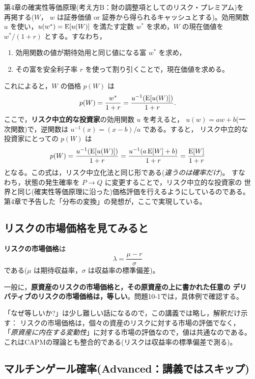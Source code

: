 第4章の確実性等価原理(考え方B：財の調整項としてのリスク・プレミアム)を
再掲する($W$， $w$ は証券価値 or 証券から得られるキャッシュとする)。効用関数
$u$ を使い，$u(w^*) = \mathrm{E}[u(W)]$ を満たす定数 $w^*$ を求め，$W$ の現在価値を
$w^*/(1+r)$ とする。すなわち，
\begin{enumerate}
\item 効用関数の値が期待効用と同じ値になる富 $w^*$ を求め，
\item その富を安全利子率 $r$ を使って割り引くことで，現在価値を求める。
\end{enumerate}

これによると，$W$ の価格 $p(W)$ は
\[
p(W) = \frac{w^*}{1+r} = \frac{u^{-1}(\mathrm{E}[u(W)])}{1+r}.
\]
ここで，\textbf{リスク中立的な投資家}の効用関数 $u$ を考えると，
$u(w) = aw + b$(一次関数)で，逆関数は $u^{-1}(x) = (x-b)/a$ である。すると，
リスク中立的な投資家にとっての $p(W)$ は
\[
p(W) = \frac{u^{-1}(\mathrm{E}[u(W)])}{1+r}
= \frac{u^{-1}(a\,\mathrm{E}[W] + b)}{1+r}
= \frac{\mathrm{E}[W]}{1+r}
\]
となる。この式は，リスク中立化法と同じ形である(\emph{違うのは確率だけ})。
すなわち，状態の発生確率を $P\to Q$ に変更することで，リスク中立的な投資家の
世界と同じ(確実性等価原理に沿った)価格評価を行えるようにしているのである。
第4章で予告した「分布の変換」の発想が，ここで実現している。

\subsection{リスクの市場価格を見てみると}

\textbf{リスクの市場価格}は
\[
\lambda = \frac{\mu - r}{\sigma}
\]
である($\mu$ は期待収益率，$\sigma$ は収益率の標準偏差)。

\begin{keypoint}
一般に，\textbf{原資産のリスクの市場価格と，その原資産の上に書かれた任意の
デリバティブのリスクの市場価格は，等しい}。問題10-1では，具体例で確認する。
\end{keypoint}

「なぜ等しいか?」は少し難しい話になるので，この講義では略し，解釈だけ示す：
リスクの市場価格は，個々の資産のリスクに対する市場の評価でなく，
「\emph{原資産に内在する変動性}」に対する市場の評価なので，値は共通なのである。
これはCAPMの理論とも整合的である(リスクは収益率の標準偏差で測る)。

\subsection{マルチンゲール確率(Advanced：講義ではスキップ)}

